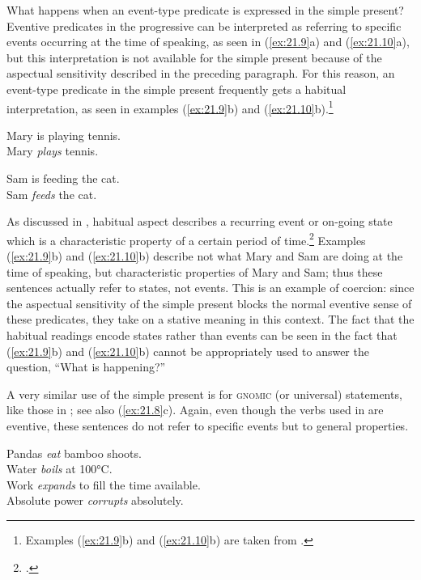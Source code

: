 What happens when an event-type predicate is expressed in the simple present? Eventive predicates in the progressive can be interpreted as referring to specific events occurring at the time of speaking, as seen in (\ref{ex:21.9}a) and (\ref{ex:21.10}a), but this interpretation is not available for the simple present because of the aspectual sensitivity described in the preceding paragraph. For this reason, an event-type predicate in the simple present frequently gets a habitual interpretation, as seen in examples (\ref{ex:21.9}b) and (\ref{ex:21.10}b).\footnote{Examples (\ref{ex:21.9}b) and (\ref{ex:21.10}b) are taken from \citet[185]{Smith1997}.}


\ea \label{ex:21.9}
\ea  Mary is playing tennis.\\
\ex Mary \textit{plays} tennis.
                       \z
\z

\ea \label{ex:21.10}
\ea  Sam is feeding the cat.\\
\ex Sam \textit{feeds} the cat.
                       \z
\z

As discussed in , habitual aspect describes a recurring event or on-going state which is a characteristic property of a certain period of time.\footnote{\citet[27--28]{Comrie1976}.} Examples (\ref{ex:21.9}b) and (\ref{ex:21.10}b) describe not what Mary and Sam are doing at the time of speaking, but characteristic properties of Mary and Sam; thus these sentences actually refer to states, not events. This is an example of coercion: since the aspectual sensitivity of the simple present blocks the normal eventive sense of these predicates, they take on a stative meaning in this context. The fact that the habitual readings encode states rather than events can be seen in the fact that (\ref{ex:21.9}b) and (\ref{ex:21.10}b) cannot be appropriately used to answer the question, “What is happening?”


A very similar use of the simple present is for \textsc{gnomic} (or universal) statements, like those in ; see also (\ref{ex:21.8}c). Again, even though the verbs used in  are eventive, these sentences do not refer to specific events but to general properties.


\ea \label{ex:21.11}
\ea  Pandas \textit{eat} bamboo shoots.\\
\ex Water \textit{boils} at 100°C.\\
\ex Work \textit{expands} to fill the time available.\\
\ex Absolute power \textit{corrupts} absolutely.
                       \z
\z

